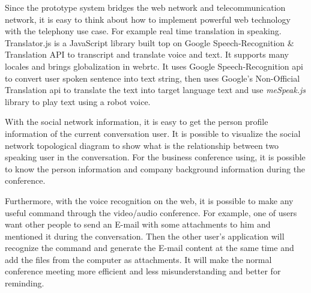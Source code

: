 \par Since the prototype system bridges the web network and telecommunication network, it is easy to think about how to implement powerful web technology with the telephony use case. For example real time translation in speaking. Translator.js is a JavaScript library built top on Google Speech-Recognition \& Translation API to transcript and translate voice and text. It supports many locales and brings globalization in \gls{webrtc}.\cite{github:translatorjs} It uses Google Speech-Recognition \gls{api} to convert user spoken sentence into text string, then uses Google's Non-Official Translation \gls{api} to translate the text into target language text and use \textit{meSpeak.js} library to play text using a robot voice.

\par With the social network information, it is easy to get the person profile information of the current conversation user. It is possible to visualize the social network topological diagram to show what is the relationship between two speaking user in the conversation. For the business conference using, it is possible to know the person information and company background information during the conference.

\par Furthermore, with the voice recognition on the web, it is possible to make any useful command through the video/audio conference. For example, one of users want other people to send an E-mail with some attachments to him and mentioned it during the conversation. Then the other user's application will recognize the command and generate the E-mail content at the same time and add the files from the computer as attachments. It will make the normal conference meeting more efficient and less misunderstanding and better for reminding.

